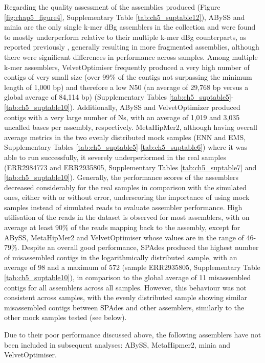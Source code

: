 Regarding the quality assessment of the assemblies produced (Figure \ref{fig:chap5_figure4}, Supplementary Table \ref{tab:ch5_suptable12}), ABySS and minia are the only single k-mer \ac{dBg} assemblers in the collection and were found to mostly underperform relative to their multiple k-mer \ac{dBg} counterparts, as reported previously \cite{sczyrba_critical_2017, meyer_critical_2022, xavier_employing_2014, mahadik_scalable_2019}, generally resulting in more fragmented assemblies, although there were significant differences in performance across samples. Among multiple k-mer assemblers, VelvetOptimiser frequently produced a very high number of contigs of very small size (over 99\% of the contigs not surpassing the minimum length of 1,000 \ac{bp}) and therefore a low N50 (an average of 29,768 \ac{bp} versus a global average of 84,114 \ac{bp}) (Supplementary Tables \ref{tab:ch5_suptable5}-\ref{tab:ch5_suptable10}). Additionally, ABySS and VelvetOptimizer produced contigs with a very large number of Ns, with an average of 1,019 and 3,035 uncalled bases per assembly, respectively. MetaHipMer2, although having overall average metrics in the two evenly distributed mock samples (ENN and EMS, Supplementary Tables \ref{tab:ch5_suptable5}-\ref{tab:ch5_suptable6}) where it was able to run successfully, it severely underperformed in the real samples (ERR2984773 and ERR2935805, Supplementary Tables \ref{tab:ch5_suptable7} and \ref{tab:ch5_suptable10}). Generally, the performance scores of the assemblers decreased considerably for the real samples in comparison with the simulated ones, either with or without error, underscoring the importance of using mock samples instead of simulated reads to evaluate assembler performance. High utilisation of the reads in the dataset is observed for most assemblers, with on average at least 90\% of the reads mapping back to the assembly, except for ABySS, MetaHipMer2 and VelvetOptimiser whose values are in the range of 46-79\%. Despite an overall good performance, SPAdes produced the highest number of misassembled contigs in the logarithmically distributed sample, with an average of 98 and a maximum of 572 (sample ERR2935805, Supplementary Table \ref{tab:ch5_suptable10}), in comparison to the global average of 11 misassembled contigs for all assemblers across all samples. However, this behaviour was not consistent across samples, with the evenly distributed sample showing similar misassembled contigs between SPAdes and other assemblers, similarly to the other mock samples tested (see below).

Due to their poor performance discussed above, the following assemblers have not been included in subsequent analyses: ABySS, MetaHipmer2, minia and VelvetOptimiser. 

